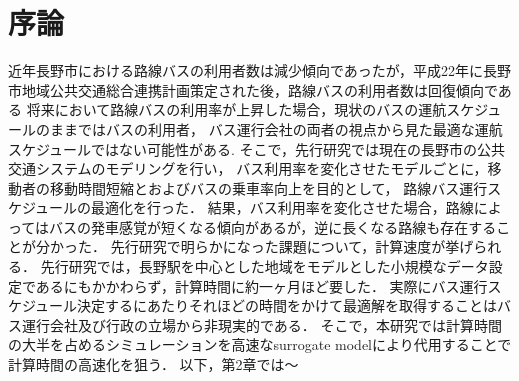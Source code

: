 \documentclass[main]{subfiles}
\begin{document}
\chapter{序論}
近年長野市における路線バスの利用者数は減少傾向であったが，平成22年に長野市地域公共交通総合連携計画策定された後，路線バスの利用者数は回復傾向である\cite{naganokeikaku}
将来において路線バスの利用率が上昇した場合，現状のバスの運航スケジュールのままではバスの利用者，
バス運行会社の両者の視点から見た最適な運航スケジュールではない可能性がある.
そこで，先行研究では現在の長野市の公共交通システムのモデリングを行い，
バス利用率を変化させたモデルごとに，移動者の移動時間短縮とおよびバスの乗車率向上を目的として，
路線バス運行スケジュールの最適化を行った．
結果，バス利用率を変化させた場合，路線によってはバスの発車感覚が短くなる傾向があるが，逆に長くなる路線も存在することが分かった．
先行研究で明らかになった課題について，計算速度が挙げられる．
先行研究では，長野駅を中心とした地域をモデルとした小規模なデータ設定であるにもかかわらず，計算時間に約一ヶ月ほど要した．
実際にバス運行スケジュール決定するにあたりそれほどの時間をかけて最適解を取得することはバス運行会社及び行政の立場から非現実的である．
そこで，本研究では計算時間の大半を占めるシミュレーションを高速なsurrogate modelにより代用することで計算時間の高速化を狙う．
以下，第2章では～
\end{document}
